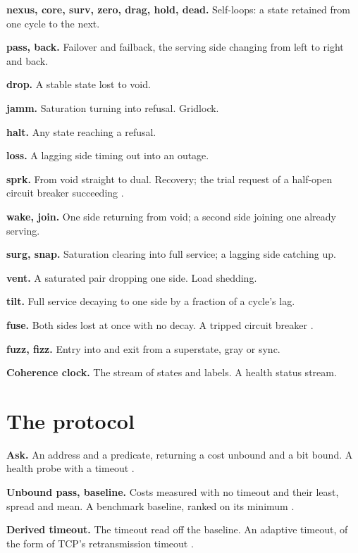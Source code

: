 \noindent\textbf{nexus, core, surv, zero, drag, hold, dead.} Self-loops: a state retained from one
cycle to the next.

\noindent\textbf{pass, back.} Failover and failback, the serving side changing from left to right
and back.

\noindent\textbf{drop.} A stable state lost to void.

\noindent\textbf{jamm.} Saturation turning into refusal. Gridlock.

\noindent\textbf{halt.} Any state reaching a refusal.

\noindent\textbf{loss.} A lagging side timing out into an outage.

\noindent\textbf{sprk.} From void straight to dual. Recovery; the trial request of a half-open
circuit breaker succeeding \cite{src:Nygard}.

\noindent\textbf{wake, join.} One side returning from void; a second side joining one already
serving.

\noindent\textbf{surg, snap.} Saturation clearing into full service; a lagging side catching up.

\noindent\textbf{vent.} A saturated pair dropping one side. Load shedding.

\noindent\textbf{tilt.} Full service decaying to one side by a fraction of a cycle's lag.

\noindent\textbf{fuse.} Both sides lost at once with no decay. A tripped circuit breaker
\cite{src:Nygard}.

\noindent\textbf{fuzz, fizz.} Entry into and exit from a superstate, gray or sync.

\noindent\textbf{Coherence clock.} The stream of states and labels. A health status stream.

\section{The protocol}

\noindent\textbf{Ask.} An address and a predicate, returning a cost unbound and a bit bound. A
health probe with a timeout \cite{src:Kubernetes-probes}.

\noindent\textbf{Unbound pass, baseline.} Costs measured with no timeout and their least, spread
and mean. A benchmark baseline, ranked on its minimum \cite{src:Chen-Revels}.

\noindent\textbf{Derived timeout.} The timeout read off the baseline. An adaptive timeout, of the
form of TCP's retransmission timeout \cite{src:RFC6298}.

